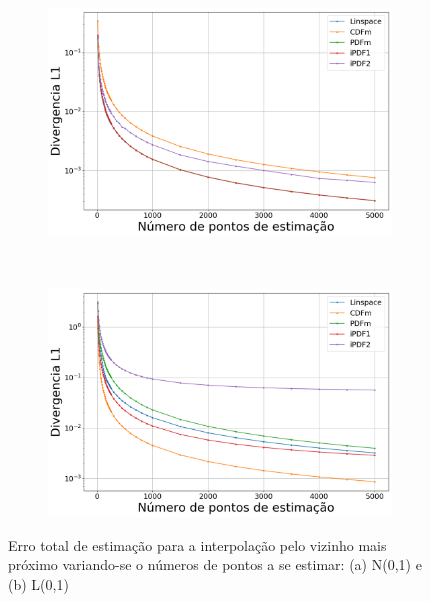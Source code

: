 \begin{figure}[H]
	\centering
	\begin{subfigure}[b]{0.45\textwidth}
		\centering 
		\includegraphics[width=\textwidth]{./figuras/ERRORPLOT_L1_TRUE_NORMAL_NEAREST_00}
		\caption{}
		\label{fig:errornormnearest}
	\end{subfigure}
	\hfill
	~ %
	\begin{subfigure}[b]{0.45\textwidth}
		\centering 
		\includegraphics[width=\textwidth]{./figuras/ERRORPLOT_L1_TRUE_LOGNORMAL_NEAREST_00}
		\caption{}
		\label{fig:errorlognearest}
	\end{subfigure}
	
	\caption{Erro total de estimação para a interpolação pelo vizinho mais próximo variando-se o números de pontos a se estimar: (a) N(0,1) e (b) L(0,1)}
	\label{fig:errorplotnearest}
\end{figure}

